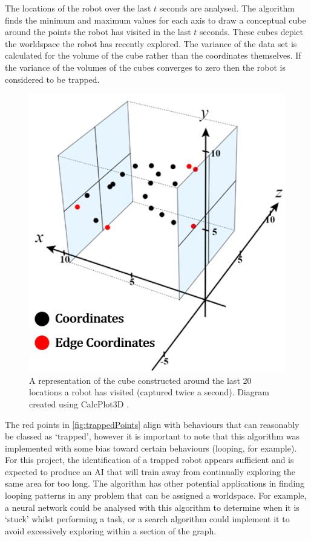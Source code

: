 \documentclass{article}
\begin{document}
The locations of the robot over the last $t$ seconds are analysed. The algorithm finds the minimum and maximum values for each axis to draw a conceptual cube around the points the robot has visited in the last $t$ seconds. These cubes depict the  worldspace the robot has recently explored. The variance of the data set is calculated for the volume of the cube rather than the coordinates themselves. If the variance of the volumes of the cubes converges to zero then the robot is considered to be trapped. \\
\begin{figure}[H]
\centering
\includegraphics[scale=0.5]{trappedAlgorithm}
\caption{A representation of the cube constructed around the last 20 locations a robot has visited (captured twice a second). Diagram created using CalcPlot3D \citep{diagrams}.}
\end{figure}

The red points in \autoref{fig:trappedPoints} align with behaviours that can reasonably be classed as ‘trapped’, however it is important to note that this algorithm was implemented with some bias toward certain behaviours (looping, for example). For this project, the identification of a trapped robot appears sufficient and is expected to produce an AI that will train away from continually exploring the same area for too long. The algorithm has other potential applications in finding looping patterns in any problem that can be assigned a worldspace. For example, a neural network could be analysed with this algorithm to determine when it is ‘stuck’ whilst performing a task, or a search algorithm could implement it to avoid excessively exploring within a section of the graph. 
\end{document}
